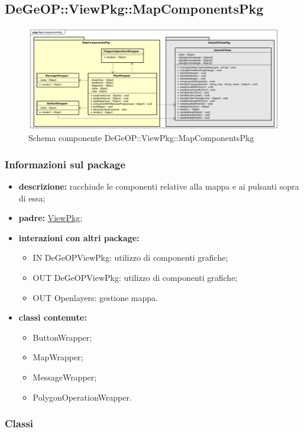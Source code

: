 \subsection{DeGeOP::ViewPkg::MapComponentsPkg}
\label{pkg::MapComponentsPkg}
\begin{figure}[H]
	\centering
	\includegraphics[width=\textwidth]{img/PkgDiagram/MapComponentsPkg.png}
	\caption{Schema componente DeGeOP::ViewPkg::MapComponentsPkg}
\end{figure}
\subsubsection{Informazioni sul package}
\begin{itemize}
	\item \textbf{descrizione:} racchiude le componenti relative alla mappa e ai pulsanti sopra di essa;
	\item \textbf{padre:} \hyperref[pkg::ViewPkg]{ViewPkg};
	\item \textbf{interazioni con altri package:} 
	\begin{itemize}
		\item IN DeGeOPViewPkg: utilizzo di componenti grafiche;
		\item OUT DeGeOPViewPkg: utilizzo di componenti grafiche;
		\item OUT Openlayers: gestione mappa.
	\end{itemize}
	\item \textbf{classi contenute:}
	\begin{itemize}
		\item ButtonWrapper;
		\item MapWrapper;
		\item MessageWrapper;
		\item PolygonOperationWrapper.
	\end{itemize}
\end{itemize}
\subsubsection{Classi}
